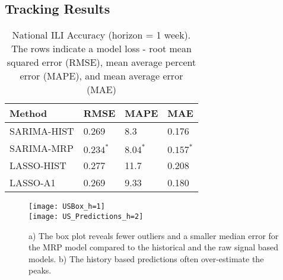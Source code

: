 \documentclass[fleqn,10pt]{wlscirep}
\begin{document}
\subsection*{Tracking Results}

\begin{table}[tbp]
\centering
\begin{tabular}{|l|l|l|l|}
\hline
Method        & RMSE  & MAPE  & MAE \\ \hline
SARIMA-HIST       & 0.269 & 8.3  & 0.176\\ \hline
SARIMA-MRP           & $\mathbf{0.234^*}$ & $\mathbf{8.04^*}$ & $\mathbf{0.157^*}$\\ \hline
LASSO-HIST & 0.277 & 11.7 & 0.208\\ \hline
LASSO-A1      & 0.269 & 9.33 & 0.180\\ \hline
\end{tabular}
\caption{National ILI Accuracy (horizon = 1 week). The rows indicate a model loss - root mean squared error (RMSE), mean average percent error (MAPE), and mean average error (MAE)}
\label{table:mse-national}
\end{table}

 \begin{figure}%
 \centering
 \texttt{[image: USBox\_h=1]}\\
 \texttt{[image: US\_Predictions\_h=2]}
 \caption{a) The box plot reveals fewer outliers and a smaller median error for the MRP model compared to the historical and the raw signal based models. b) The history based predictions often over-estimate the peaks.}
  \label{fig:US_Box}
 \end{figure}
 


\end{document}
